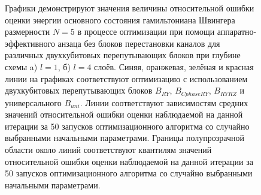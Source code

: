 \documentclass[14pt]{extarticle}
\begin{document}
\begin{figure}[H]
\begin{minipage}[H]{1.\linewidth}
\end{minipage}
\vfill
\begin{minipage}[H]{1.\linewidth}
\end{minipage}
\caption{Графики демонстрируют значения величины относительной ошибки оценки энергии основного состояния гамильтониана Швингера размерности $N = 5$ в процессе оптимизации при помощи аппаратно-эффективного анзаца без блоков перестановки каналов для различных двухкубитовых перепутывающих блоков при глубине схемы a) $l = 1$, б) $l = 4$ слоёв. Синяя, оранжевая, зелёная и красная линии на графиках соответствуют оптимизацию с использованием двухкубитовых перепутывающих блоков $B_{RY}$, $B_{Cphase RY}$, $B_{RY RZ}$ и универсального $B_{uni}$. Линии соответствуют зависимостям средних значений относительной ошибки оценки наблюдаемой на данной итерации за 50 запусков оптимизационного алгоритма со случайно выбранными начальными параметрами. Границы полупрозрачной области около линий соответствуют квантилям значений относительной ошибки оценки наблюдаемой на данной итерации за 50 запусков оптимизационного алгоритма со случайно выбранными начальными параметрами.}\label{fig:mix_block_comp}
\end{figure}
\end{document}
